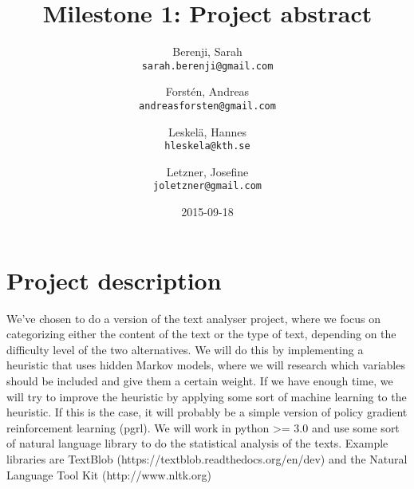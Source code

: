 \documentclass[a4paper]{article}
\title{Milestone 1: Project abstract}
\author{
  Berenji, Sarah\\
  \texttt{sarah.berenji@gmail.com}
  \and
  Forstén, Andreas\\
  \texttt{andreasforsten@gmail.com}
  \and
  Leskelä, Hannes\\
  \texttt{hleskela@kth.se}
  \and
  Letzner, Josefine\\
    \texttt{joletzner@gmail.com}
}
\date{2015-09-18}
\begin{document}
\maketitle
\section*{{Project description}}

We've chosen to do a version of the text analyser project, where we focus on categorizing either the content of the text or the type of text, depending on the difficulty level of the two alternatives. We will do this by implementing a heuristic that uses hidden Markov models, where we will research which variables should be included and give them a certain weight. If we have enough time, we will try to improve the heuristic by applying some sort of machine learning to the heuristic. If this is the case, it will probably be a simple version of policy gradient reinforcement learning (pgrl). We will work in python >= 3.0 and use some sort of natural language library to do the statistical analysis of the texts. Example libraries are TextBlob (https://textblob.readthedocs.org/en/dev) and the Natural Language Tool Kit (http://www.nltk.org)
\newline
\newline
\end{document}
